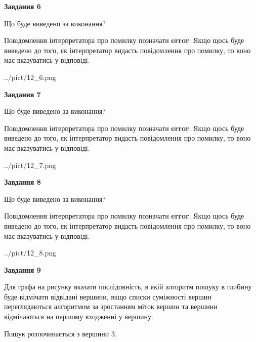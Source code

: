 \documentclass[12pt, ukrainian]{article}
\begin{document}
{\begin {large}
{\begin {center}\textbf{Завдання 6}\end {center}}\par
Що буде виведено за виконання?

Повідомлення інтерпретатора про помилку позначати \textbf{error}.
Якщо щось буде виведено до того, як інтерпретатор видасть повідомлення про помилку, 
то воно має вказуватись у відповіді. \par


\begin{center}
	{../pict/12_6.png}
\end{center}
\newpage

{\begin {center}\textbf{Завдання 7}\end {center}}\par
Що буде виведено за виконання?

Повідомлення інтерпретатора про помилку позначати \textbf{error}.
Якщо щось буде виведено до того, як інтерпретатор видасть повідомлення про помилку, 
то воно має вказуватись у відповіді. \par


\begin{center}
	{../pict/12_7.png}
\end{center}
\newpage

{\begin {center}\textbf{Завдання 8}\end {center}}\par
Що буде виведено за виконання?

Повідомлення інтерпретатора про помилку позначати \textbf{error}.
Якщо щось буде виведено до того, як інтерпретатор видасть повідомлення про помилку, 
то воно має вказуватись у відповіді. \par


\begin{center}
	{../pict/12_8.png}
\end{center}
\newpage

{\begin {center}\textbf{Завдання 9}\end {center}}\par
Для графа на рисунку вказати послідовність, в якій алгоритм пошуку в глибину буде відмічати відвідані вершини, якщо списки суміжності вершин переглядаються алгоритмом за зростанням міток вершин та вершини відмічаються на першому вход\-женні у вершину.\par
Пошук розпочинається з вершини 3.\par


\end{large}}
\end{document}
